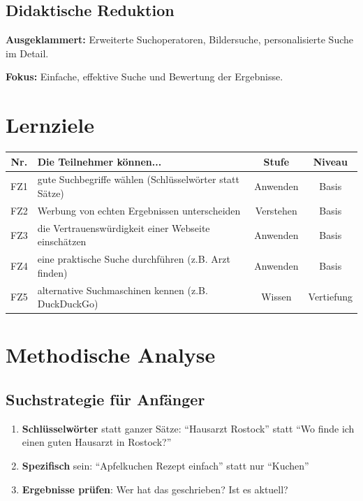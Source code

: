 \documentclass[11pt,a4paper]{article}
\begin{document}
\subsection{Didaktische Reduktion}
\textbf{Ausgeklammert:} Erweiterte Suchoperatoren, Bildersuche, personalisierte Suche im Detail.

\textbf{Fokus:} Einfache, effektive Suche und Bewertung der Ergebnisse.

\section{Lernziele}

\begin{tabular}{|c|p{7cm}|c|c|}
\hline
\textbf{Nr.} & \textbf{Die Teilnehmer können...} & \textbf{Stufe} & \textbf{Niveau} \\
\hline
FZ1 & gute Suchbegriffe wählen (Schlüsselwörter statt Sätze) & Anwenden & Basis \\
FZ2 & Werbung von echten Ergebnissen unterscheiden & Verstehen & Basis \\
FZ3 & die Vertrauenswürdigkeit einer Webseite einschätzen & Anwenden & Basis \\
FZ4 & eine praktische Suche durchführen (z.B. Arzt finden) & Anwenden & Basis \\
FZ5 & alternative Suchmaschinen kennen (z.B. DuckDuckGo) & Wissen & Vertiefung \\
\hline
\end{tabular}

\section{Methodische Analyse}

\subsection{Suchstrategie für Anfänger}
\begin{tippbox}
\begin{enumerate}
    \item \textbf{Schlüsselwörter} statt ganzer Sätze: ``Hausarzt Rostock'' statt ``Wo finde ich einen guten Hausarzt in Rostock?''
    \item \textbf{Spezifisch} sein: ``Apfelkuchen Rezept einfach'' statt nur ``Kuchen''
    \item \textbf{Ergebnisse prüfen}: Wer hat das geschrieben? Ist es aktuell?
\end{enumerate}
\end{tippbox}
\end{document}
